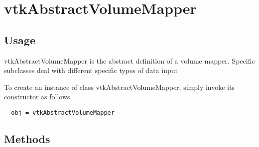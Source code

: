 \section{vtkAbstractVolumeMapper}

\subsection{Usage}

 vtkAbstractVolumeMapper is the abstract definition of a volume mapper.  
 Specific subclasses deal with different specific types of data input

To create an instance of class vtkAbstractVolumeMapper, simply
invoke its constructor as follows
\begin{verbatim}
  obj = vtkAbstractVolumeMapper
\end{verbatim}
\subsection{Methods}

